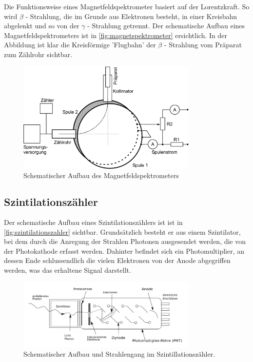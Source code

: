 \documentclass[12pt,english,ngerman]{scrartcl}
\begin{document}
Die Funktionsweise eines Magnetfeldspektrometer basiert auf der Lorentzkraft.
So wird \(\beta\) - Strahlung, die im Grunde aus Elektronen besteht, in einer
Kreisbahn abgelenkt und so von der \(\gamma\) - Strahlung getrennt. Der
schematische Aufbau eines Magnetfeldspektrometers ist in
\autoref{fig:magnetspektrometer} ersichtlich. In der Abbildung ist klar die
Kreisförmige 'Flugbahn' der \(\beta\) - Strahlung vom Präparat zum Zählrohr
sichtbar.\cite[]{demex2}

\begin{figure}[H]
	\begin{center}
		\includegraphics[width = 0.8\textwidth]{./figures/fig5.png}
	\end{center}
	\caption{Schematischer Aufbau des
		Magnetfeldspektrometers~\cite[]{zaehlrohrvorbereitung}}\label{fig:magnetspektrometer}
\end{figure}

\subsection{Szintilationszähler}

Der schematische Aufbau eines Szintilationszählers ist ist in
\autoref{fig:szintilationszahler} sichtbar. Grundsätzlich besteht er aus einem
Szintilator, bei dem durch die Anregung der Strahlen Photonen ausgesendet
werden, die von der Photokathode erfasst werden. Dahinter befindet sich ein
Photomultiplier, an dessen Ende schlussendlich die vielen Elektronen von der
Anode abgegriffen werden, was das erhaltene Signal darstellt.\cite{gerthsen}

\begin{figure}[H]
	\begin{center}
		\includegraphics[width = 0.8\textwidth]{./figures/szintilationszahler.png}
	\end{center}
	\caption{Schematischer Aufbau und
		Strahlengang im Szintillationszähler.~\cite[]{zaehlrohrvorbereitung}}\label{fig:szintilationszahler}
\end{figure}
\end{document}
